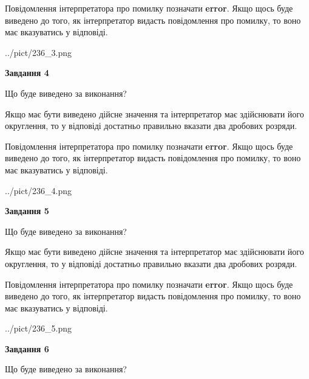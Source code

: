 \documentclass[12pt, ukrainian]{article}
\begin{document}
{\begin {Large}
Повідомлення інтерпретатора про помилку позначати \textbf{error}.
Якщо щось буде виведено до того, як інтерпретатор видасть повідомлення про помилку, 
то воно має вказуватись у відповіді. \par

\begin{center}
	{../pict/236_3.png}
\end{center}
\newpage

{\begin {center}\textbf{Завдання 4}\end {center}}\par
Що буде виведено за виконання? \par

Якщо має бути виведено дійсне значення та інтерпретатор має здійснювати його округлення, 
то у відповіді достатньо правильно вказати два дробових розряди.

Повідомлення інтерпретатора про помилку позначати \textbf{error}.
Якщо щось буде виведено до того, як інтерпретатор видасть повідомлення про помилку, 
то воно має вказуватись у відповіді. \par

\begin{center}
	{../pict/236_4.png}
\end{center}
\newpage

{\begin {center}\textbf{Завдання 5}\end {center}}\par
Що буде виведено за виконання? \par

Якщо має бути виведено дійсне значення та інтерпретатор має здійснювати його округлення, 
то у відповіді достатньо правильно вказати два дробових розряди.

Повідомлення інтерпретатора про помилку позначати \textbf{error}.
Якщо щось буде виведено до того, як інтерпретатор видасть повідомлення про помилку, 
то воно має вказуватись у відповіді. \par

\begin{center}
	{../pict/236_5.png}
\end{center}
\newpage

{\begin {center}\textbf{Завдання 6}\end {center}}\par
Що буде виведено за виконання? \par


\end{Large}}
\end{document}
